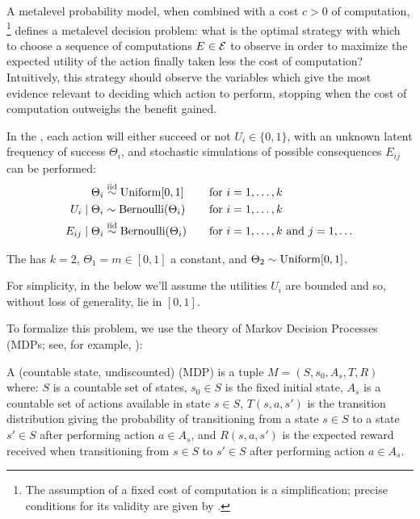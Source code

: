 A metalevel probability model, when combined with a cost $c>0$ of computation,%
\footnote{The assumption of a fixed cost of computation is a simplification; 
	precise conditions for its validity are given by \citep{Harada:1997}.} 
defines a metalevel decision problem: what is the optimal strategy with which to choose a sequence 
of computations $E\in\mathcal{E}$ to observe in order to maximize the expected utility 
of the action finally taken less the cost of computation?  Intuitively, 
this strategy should observe the variables which give the most evidence relevant
to deciding which action to perform, stopping when the cost of computation 
outweighs the benefit gained.

\begin{example}\label{example:bernoulli}
In the ,
each action will either succeed or not $U_i\in\{0,1\}$, with an unknown latent frequency of success $\Theta_i$, 
and stochastic simulations of possible consequences $E_{ij}$ can be performed:
\begin{align*}
	\Theta_i &\stackrel{\rm iid}{\sim} {\rm Uniform}[0,1]                      &&\quad\text{for $i=1,\dots,k$}\\
	U_i \mathrel{|} \Theta_i &\sim {\rm Bernoulli}(\Theta_i) &&\quad\text{for $i=1,\dots,k$}\\
	E_{ij} \mathrel{|} \Theta_i &\stackrel{\rm iid}{\sim} {\rm Bernoulli}(\Theta_i) &&\quad\text{for $i=1,\dots,k$ and $j=1,\dots$}
\end{align*}

The  has $k=2$,
$\Theta_1=m\in[0,1]$ a constant, and $\Theta_2\sim{\rm Uniform}[0,1]$.
\end{example}

For simplicity, in the below we'll assume the utilities $U_i$ are bounded and so, 
without loss of generality, lie in $[0,1]$.  

To formalize this problem, we use the theory of Markov Decision Processes (MDPs; 
see, for example, \citet{Puterman:1994}):

\begin{dfn}
A (countable state, undiscounted)  (MDP) is a tuple $M=(S,s_0,A_s,T,R)$ where:
	$S$ is a countable set of states,
	$s_0\in S$ is the fixed initial state,
	$A_s$ is a countable set of actions available in state $s\in S$,
	$T(s,a,s')$ is the transition distribution 
	giving the probability of transitioning from a state $s\in S$ to a state $s'\in S$ after performing action $a\in A_s$,
	and $R(s,a,s')$ is the expected reward received when transitioning from $s\in S$ to $s'\in S$ after performing action $a\in A_s$.
\end{dfn}

